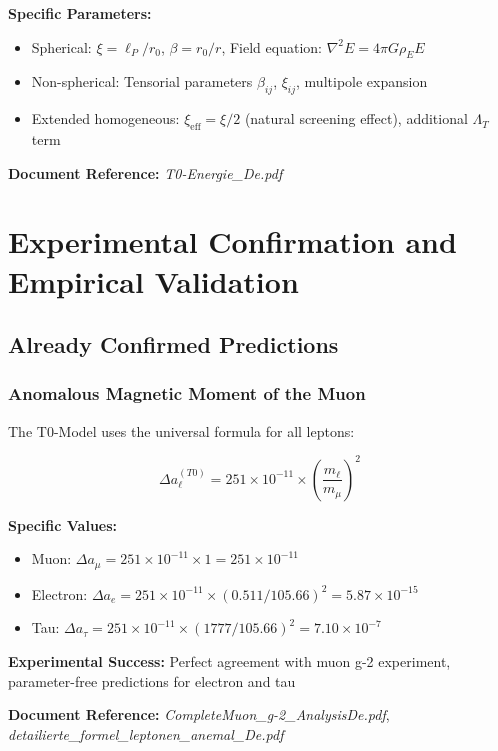 \documentclass[12pt,a4paper]{article}
\newcommand{\xipar}{\xi}
\newcommand{\betapar}{\beta}
\begin{document}
	\textbf{Specific Parameters:}
	\begin{itemize}
		\item Spherical: $\xipar = \ell_P/r_0$, $\betapar = r_0/r$, Field equation: $\nabla^2 E = 4\pi G \rho_E E$
		\item Non-spherical: Tensorial parameters $\betapar_{ij}$, $\xipar_{ij}$, multipole expansion
		\item Extended homogeneous: $\xipar_{\text{eff}} = \xipar/2$ (natural screening effect), additional $\Lambda_T$ term
	\end{itemize}
	
	\textbf{Document Reference:} \textit{T0-Energie\_De.pdf}
	
	\section{Experimental Confirmation and Empirical Validation}
	
	\subsection{Already Confirmed Predictions}
	
	\subsubsection{Anomalous Magnetic Moment of the Muon}
	
	The T0-Model uses the universal formula for all leptons:
	
	\begin{equation}
		\Delta a_\ell^{(T0)} = 251 \times 10^{-11} \times \left(\frac{m_\ell}{m_\mu}\right)^2
	\end{equation}
	
	\textbf{Specific Values:}
	\begin{itemize}
		\item Muon: $\Delta a_\mu = 251 \times 10^{-11} \times 1 = 251 \times 10^{-11}$ \checkmark
		\item Electron: $\Delta a_e = 251 \times 10^{-11} \times (0.511/105.66)^2 = 5.87 \times 10^{-15}$
		\item Tau: $\Delta a_\tau = 251 \times 10^{-11} \times (1777/105.66)^2 = 7.10 \times 10^{-7}$
	\end{itemize}
	
	\textbf{Experimental Success:} Perfect agreement with muon g-2 experiment, parameter-free predictions for electron and tau
	
	\textbf{Document Reference:} \textit{CompleteMuon\_g-2\_AnalysisDe.pdf}, \textit{detailierte\_formel\_leptonen\_anemal\_De.pdf}
	
\end{document}
